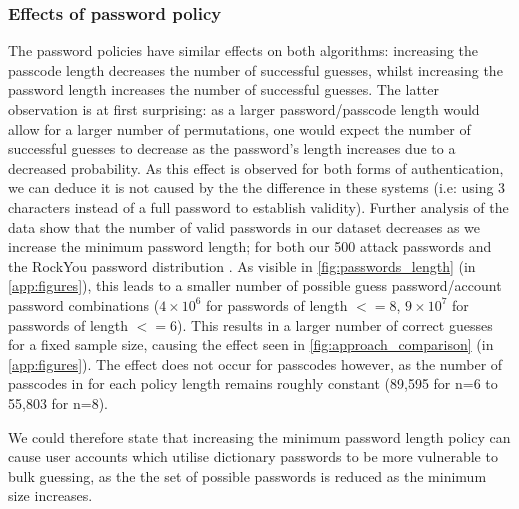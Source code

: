 \documentclass[british,11pt,a4paper]{article}
\begin{document}
\subsubsection{Effects of password policy}
The password policies have similar effects on both algorithms: increasing the passcode length decreases the number of successful guesses, whilst increasing the password length increases the number of successful guesses. The latter observation is at first surprising: as a larger password/passcode length would allow for a larger number of permutations, one would expect the number of successful guesses to decrease as the password's length increases due to a decreased probability. As this effect is observed for both forms of authentication, we can deduce it is not caused by the the difference in these systems (i.e: using 3 characters instead of a full password to establish validity). Further analysis of the data show that the number of valid passwords in our dataset decreases as we increase the minimum password length; for both our 500 attack passwords and the RockYou password distribution \cite{Cubrilovic2009-wu}. As visible in \autoref{fig:passwords_length} (in \autoref{app:figures}), this leads to a smaller number of possible guess password/account password combinations ($4 \times 10^6 $ for  passwords  of length $<= 8$, $9 \times 10^7$ for passwords of length $<= 6$). This results in a larger number of correct guesses for a fixed sample size, causing the effect seen in \autoref{fig:approach_comparison} (in \autoref{app:figures}). The effect does not occur for passcodes however, as the number of passcodes in \cite{Cubrilovic2009-wu} for each policy length remains roughly constant (89,595 for n=6 to 55,803 for n=8). 

We could therefore state that increasing the minimum password length policy can cause user accounts which utilise dictionary passwords to be more vulnerable to bulk guessing, as the the set of possible passwords is reduced as the minimum size increases.





\end{document}
